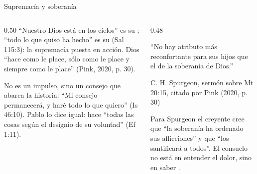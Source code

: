 \begin{frame}{Supremacía y soberanía}
\begin{columns}[t,onlytextwidth]
\begin{column}{0.50\textwidth}\small
``Nuestro Dios está en los cielos'' es su ; ``todo lo que quiso ha hecho'' es su  (Sal 115:3): la supremacía puesta en acción. Dios ``hace como le place, sólo como le place y siempre como le place'' (Pink, 2020, p. 30).\par\medskip
No es un impulso, sino un consejo que abarca la historia: ``Mi consejo permanecerá, y haré todo lo que quiero'' (Is 46:10). Pablo lo dice igual: hace ``todas las cosas según el designio de su voluntad'' (Ef 1:11).
\end{column}
\begin{column}{0.48\textwidth}
\begin{tcolorbox}[colback=papiro,colframe=dorado,boxrule=1.2pt,arc=3pt]
\footnotesize ``No hay atributo más reconfortante para sus hijos que el de la soberanía de Dios.''\par\hfill{\scriptsize C. H. Spurgeon, sermón sobre Mt 20:15, citado por Pink (2020, p. 30)}
\end{tcolorbox}
\small Para Spurgeon el creyente cree que ``la soberanía ha ordenado sus aflicciones'' y que ``los santificará a todos''. El consuelo no está en entender el dolor, sino en saber .
\end{column}
\end{columns}
\end{frame}

